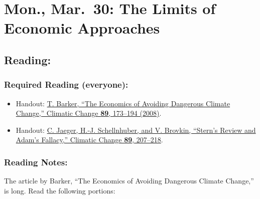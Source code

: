 \documentclass[
]{article}
\providecommand{\tightlist}{%
  \setlength{\itemsep}{0pt}\setlength{\parskip}{0pt}}
\begin{document}
\hypertarget{mon.-mar.-30-the-limits-of-economic-approaches}{%
\section{Mon., Mar.~30: The Limits of Economic
Approaches}\label{mon.-mar.-30-the-limits-of-economic-approaches}}

\hypertarget{reading-32}{%
\subsection{Reading:}\label{reading-32}}

\hypertarget{required-reading-everyone-27}{%
\subsubsection{Required Reading
(everyone):}\label{required-reading-everyone-27}}

\begin{itemize}
\tightlist
\item
  Handout:
  \href{https://link-springer-com.proxy.library.vanderbilt.edu/article/10.1007/s10584-008-9433-x}{T.
  Barker, ``The Economics of Avoiding Dangerous Climate Change,''
  Climatic Change \textbf{89}, 173--194 (2008)}.
\item
  Handout:
  \href{https://link-springer-com.proxy.library.vanderbilt.edu/content/pdf/10.1007\%2Fs10584-008-9436-7.pdf}{C.
  Jaeger, H.-J. Schellnhuber, and V. Brovkin, ``Stern's Review and
  Adam's Fallacy,'' Climatic Change \textbf{89}, 207--218}.
\end{itemize}

\hypertarget{reading-notes-24}{%
\subsubsection{Reading Notes:}\label{reading-notes-24}}

The article by Barker, ``The Economics of Avoiding Dangerous Climate
Change,'' is long. Read the following portions:
\end{document}

